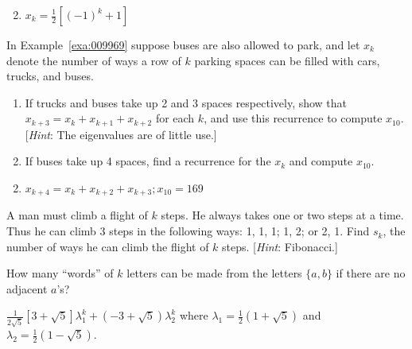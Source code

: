 \begin{multicols}{2}
\begin{ex}
\begin{sol}
\begin{enumerate}[label={\alph*.}]
\setcounter{enumi}{1}
\item  $x_k = \frac{1}{2} \left[ (-1)^k + 1  \right]$


\end{enumerate}
\end{sol}
\end{ex}

\begin{ex}
In Example~\ref{exa:009969} suppose buses are also allowed to park, and let $x_{k}$ denote the number of ways a row of $k$ parking spaces can be filled with cars, trucks, and buses.


\begin{enumerate}[label={\alph*.}]
\item If trucks and buses take up 2 and 3 spaces respectively, show that $x_{k+3} = x_{k} + x_{k+1} + x_{k+2}$ for each $k$, and use this recurrence to compute $x_{10}$. [\textit{Hint}: The eigenvalues are of little use.]

\item If buses take up 4 spaces, find a recurrence for the $x_{k}$ and compute $x_{10}$.

\end{enumerate}
\begin{sol}
\begin{enumerate}[label={\alph*.}]
\setcounter{enumi}{1}
\item  $x_{k+4} = x_k + x_{k+2} + x_{k+3}; x_{10} = 169$


\end{enumerate}
\end{sol}
\end{ex}

\begin{ex}
A man must climb a flight of $k$
 steps. He always takes one or two steps at a time. Thus he can climb 3 
steps in the following ways: 1, 1, 1; 1, 2; or 2, 1. Find $s_{k}$, the number of ways he can climb the flight of $k$ steps. [\textit{Hint}: Fibonacci.]
\end{ex}

\begin{ex}
How many ``words'' of $k$ letters can be made from the letters $\{a, b\}$ if there are no adjacent $a$'s?

\begin{sol}
$\frac{1}{2\sqrt{5}} \left[ 3 +\sqrt{5} \right] \lambda_1^k + (-3 + \sqrt{5}) \lambda_2^k$ where $ \lambda_1 = \frac{1}{2} (1 +  \sqrt{5})$ and $ \lambda_2 = \frac{1}{2} (1 -  \sqrt{5})$. 
\end{sol}
\end{ex}


\end{multicols}
